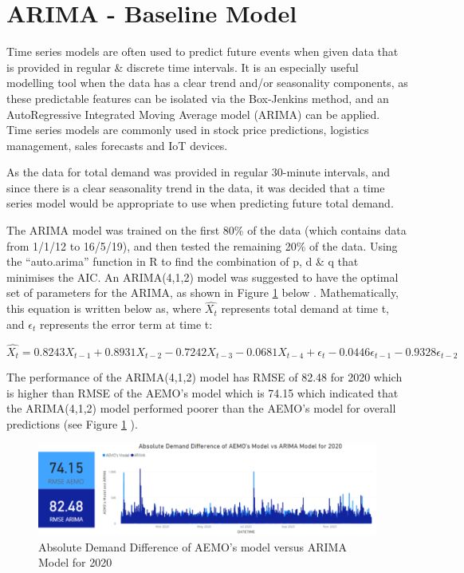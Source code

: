 \documentclass[mstat,12pt]{unswthesis}
\begin{document}
\hypertarget{arima---baseline-model}{%
\section{ARIMA - Baseline Model}\label{arima---baseline-model}}

Time series models are often used to predict future events when given
data that is provided in regular \& discrete time
intervals\cite{statistics_australian}. It is an especially useful
modelling tool when the data has a clear trend and/or seasonality
components, as these predictable features can be isolated via the
Box-Jenkins method, and an AutoRegressive Integrated Moving Average
model (ARIMA) can be applied. Time series models are commonly used in
stock price predictions, logistics management, sales forecasts and IoT
devices.

As the data for total demand was provided in regular 30-minute
intervals, and since there is a clear seasonality trend in the data, it
was decided that a time series model would be appropriate to use when
predicting future total demand.

The ARIMA model was trained on the first 80\% of the data (which
contains data from 1/1/12 to 16/5/19), and then tested the remaining
20\% of the data. Using the ``auto.arima'' function in R to find the
combination of p, d \& q that minimises the AIC. An ARIMA(4,1,2) model
was suggested to have the optimal set of parameters for the ARIMA, as
shown in Figure \ref{image33} below \cite{hyndman_2018_87}.
Mathematically, this equation is written below as, where \(\hat{X_t}\)
represents total demand at time t, and \(\epsilon_t\) represents the
error term at time t:

\[
\hat{X_t} = 0.8243X_{t-1} + 0.8931X_{t-2} - 0.7242X_{t-3} - 0.0681X_{t-4} + \epsilon_t - 0.0446\epsilon_{t-1} - 0.9328\epsilon_{t-2}
\]

The performance of the ARIMA(4,1,2) model has RMSE of 82.48 for 2020
which is higher than RMSE of the AEMO's model which is 74.15 which
indicated that the ARIMA(4,1,2) model performed poorer than the AEMO's
model for overall predictions (see Figure \ref{image33} ).

\begin{figure}[H]
\includegraphics[width=140mm]{image33.png}
\caption{Absolute Demand Difference of AEMO's model versus ARIMA Model for 2020}
\label{image33}
\end{figure}
\end{document}
